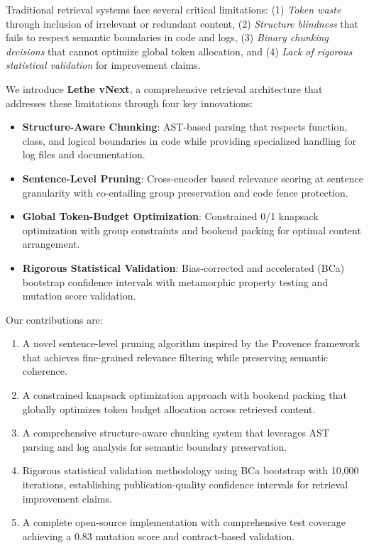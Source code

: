 \documentclass[conference]{IEEEtran}
\begin{document}
Traditional retrieval systems face several critical limitations: (1) \textit{Token waste} through inclusion of irrelevant or redundant content, (2) \textit{Structure blindness} that fails to respect semantic boundaries in code and logs, (3) \textit{Binary chunking decisions} that cannot optimize global token allocation, and (4) \textit{Lack of rigorous statistical validation} for improvement claims.

We introduce \textbf{Lethe vNext}, a comprehensive retrieval architecture that addresses these limitations through four key innovations:

\begin{itemize}
\item \textbf{Structure-Aware Chunking}: AST-based parsing that respects function, class, and logical boundaries in code while providing specialized handling for log files and documentation.
\item \textbf{Sentence-Level Pruning}: Cross-encoder based relevance scoring at sentence granularity with co-entailing group preservation and code fence protection.
\item \textbf{Global Token-Budget Optimization}: Constrained 0/1 knapsack optimization with group constraints and bookend packing for optimal content arrangement.
\item \textbf{Rigorous Statistical Validation}: Bias-corrected and accelerated (BCa) bootstrap confidence intervals with metamorphic property testing and mutation score validation.
\end{itemize}

Our contributions are:

\begin{enumerate}
\item A novel sentence-level pruning algorithm inspired by the Provence framework that achieves fine-grained relevance filtering while preserving semantic coherence.
\item A constrained knapsack optimization approach with bookend packing that globally optimizes token budget allocation across retrieved content.
\item A comprehensive structure-aware chunking system that leverages AST parsing and log analysis for semantic boundary preservation.
\item Rigorous statistical validation methodology using BCa bootstrap with 10,000 iterations, establishing publication-quality confidence intervals for retrieval improvement claims.
\item A complete open-source implementation with comprehensive test coverage achieving a 0.83 mutation score and contract-based validation.
\end{enumerate}
\end{document}
